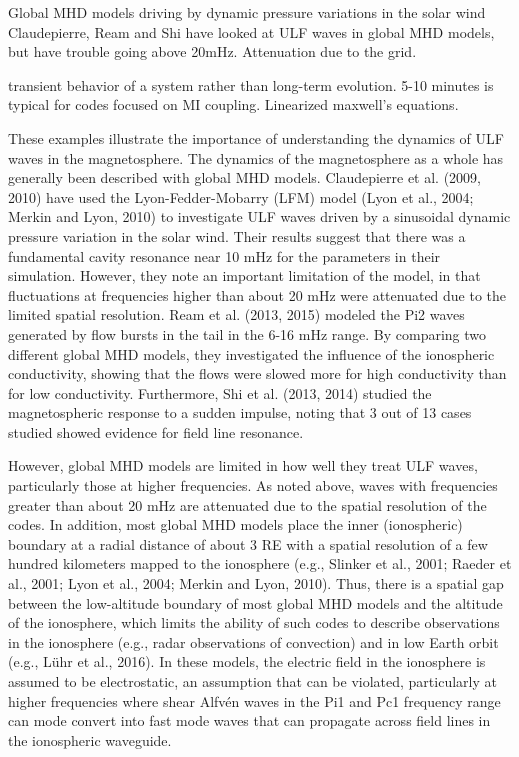\documentclass[draft,linenumbers]{agujournal}
\begin{document}
Global MHD models
driving by dynamic pressure variations in the solar wind
Claudepierre, Ream and Shi have looked at ULF waves in global MHD models, but have trouble going above 20mHz. Attenuation due to the grid.


transient behavior of a system rather than long-term evolution. 5-10 minutes is typical for codes focused on MI coupling. Linearized maxwell's equations.


















These examples illustrate the importance of understanding the dynamics of ULF waves in the magnetosphere.  The dynamics of the magnetosphere as a whole has generally been described with global MHD models.  Claudepierre et al. (2009, 2010) have used the Lyon-Fedder-Mobarry (LFM) model (Lyon et al., 2004; Merkin and Lyon, 2010) to investigate ULF waves driven by a sinusoidal dynamic pressure variation in the solar wind.  Their results suggest that there was a fundamental cavity resonance near 10 mHz for the parameters in their simulation.  However, they note an important limitation of the model, in that fluctuations at frequencies higher than about 20 mHz were attenuated due to the limited spatial resolution.  Ream et al. (2013, 2015) modeled the Pi2 waves generated by flow bursts in the tail in the 6-16 mHz range.  By comparing two different global MHD models, they investigated the influence of the ionospheric conductivity, showing that the flows were slowed more for high conductivity than for low conductivity.  Furthermore, Shi et al. (2013, 2014) studied the magnetospheric response to a sudden impulse, noting that 3 out of 13 cases studied showed evidence for field line resonance.

However, global MHD models are limited in how well they treat ULF waves, particularly those at higher frequencies.  As noted above, waves with frequencies greater than about 20 mHz are attenuated due to the spatial resolution of the codes.  In addition, most global MHD models  place the inner (ionospheric) boundary at a radial distance of about 3 RE with a spatial resolution of a few hundred kilometers mapped to the ionosphere (e.g., Slinker et al., 2001; Raeder et al., 2001; Lyon et al., 2004; Merkin and Lyon, 2010).  Thus, there is a spatial gap between the low-altitude boundary of most global MHD models and the altitude of the ionosphere, which limits the ability of such codes to describe observations in the ionosphere (e.g., radar observations of convection) and in low Earth orbit (e.g., Lühr et al., 2016).  In these models, the electric field in the ionosphere is assumed to be electrostatic, an assumption that can be violated, particularly at higher frequencies where shear Alfvén waves in the Pi1 and Pc1 frequency range can mode convert into fast mode waves that can propagate across field lines in the ionospheric waveguide.
\end{document}
